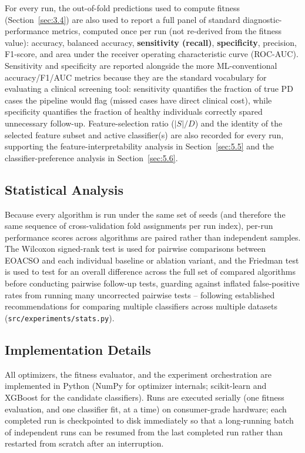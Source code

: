 For every run, the out-of-fold predictions used to compute fitness
(Section~\ref{sec:3.4}) are also used to report a full panel
of standard diagnostic-performance metrics, computed once per run (not
re-derived from the fitness value): accuracy, balanced accuracy,
\textbf{sensitivity (recall)}, \textbf{specificity}, precision, F1-score,
and area under the receiver operating characteristic curve (ROC-AUC).
Sensitivity and specificity are reported alongside the more
ML-conventional accuracy/F1/AUC metrics because they are the standard
vocabulary for evaluating a clinical screening tool: sensitivity
quantifies the fraction of true PD cases the pipeline would flag (missed
cases have direct clinical cost), while specificity quantifies the
fraction of healthy individuals correctly spared unnecessary follow-up.
Feature-selection ratio ($|S|/D$) and the identity of the selected
feature subset and active classifier(s) are also recorded for every run,
supporting the feature-interpretability analysis in
Section~\ref{sec:5.5} and the classifier-preference analysis in
Section~\ref{sec:5.6}.

\subsection{Statistical Analysis}
\label{sec:3.8}

Because every algorithm is run under the same set of seeds (and therefore
the same sequence of cross-validation fold assignments per run index),
per-run performance scores across algorithms are paired rather than
independent samples. The Wilcoxon signed-rank test \cite{Wilcoxon:1945} is
used for pairwise comparisons between EOACSO and each individual baseline
or ablation variant, and the Friedman test \cite{Friedman:1937} is used
to test for an overall difference across the full set of compared
algorithms before conducting pairwise follow-up tests, guarding against
inflated false-positive rates from running many uncorrected pairwise
tests -- following established recommendations for comparing multiple
classifiers across multiple datasets \cite{Demsar:2006}
(\texttt{src/experiments/stats.py}).

\subsection{Implementation Details}
\label{sec:3.9}

All optimizers, the fitness evaluator, and the experiment orchestration
are implemented in Python (NumPy for optimizer internals; scikit-learn
\cite{Pedregosa:2011} and XGBoost \cite{Chen:2016} for the candidate
classifiers). Runs are executed serially
(one fitness evaluation, and one classifier fit, at a time) on
consumer-grade hardware; each completed run is checkpointed to disk
immediately so that a long-running batch of independent runs can be
resumed from the last completed run rather than restarted from scratch
after an interruption.
